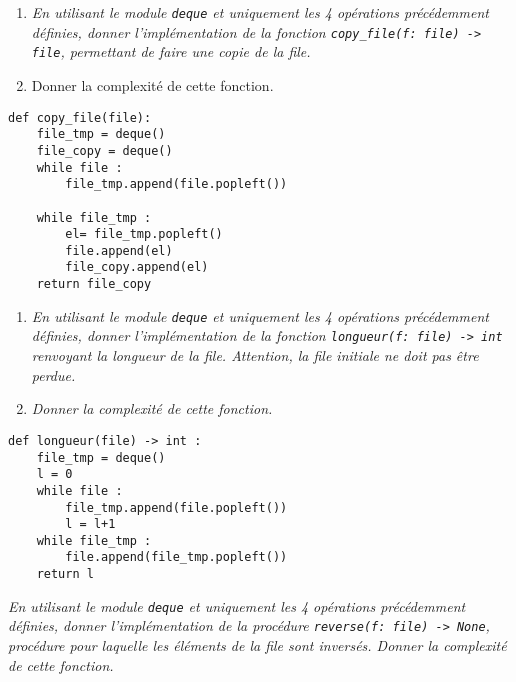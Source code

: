 \begin{exemple}
\begin{enumerate}
\item \textit{En utilisant le module \texttt{deque} et uniquement les 4 opérations précédemment définies, donner l'implémentation de la fonction \texttt{copy\_file(f: file) -> file}, permettant de faire une copie de la file.}
\item {Donner la complexité de cette fonction.}
\end{enumerate}

\ifprof
\begin{lstlisting}
def copy_file(file):
    file_tmp = deque()
    file_copy = deque()
    while file : 
        file_tmp.append(file.popleft())
        
    while file_tmp : 
        el= file_tmp.popleft()
        file.append(el)
        file_copy.append(el)
    return file_copy
\end{lstlisting}
\else
\vspace{5cm}
\fi

\end{exemple}





\begin{exemple}
\begin{enumerate}
\item \textit{En utilisant le module \texttt{deque} et uniquement les 4 opérations précédemment définies, donner l'implémentation de la fonction \texttt{longueur(f: file) -> int} renvoyant la longueur de la file. Attention, la file initiale ne doit pas être perdue.}

\item \textit{Donner la complexité de cette fonction.}
\end{enumerate}
\ifprof
\begin{lstlisting}
def longueur(file) -> int : 
    file_tmp = deque()
    l = 0
    while file : 
        file_tmp.append(file.popleft())
        l = l+1
    while file_tmp : 
        file.append(file_tmp.popleft())
    return l
\end{lstlisting}
\else
\vspace{5cm}
\fi

\end{exemple}



\begin{exemple}
\textit{En utilisant le module \texttt{deque} et uniquement les 4 opérations précédemment définies, donner l'implémentation de la procédure \texttt{reverse(f: file) -> None}, procédure pour laquelle les éléments de la file sont inversés. Donner la complexité de cette fonction.}
\end{exemple}
